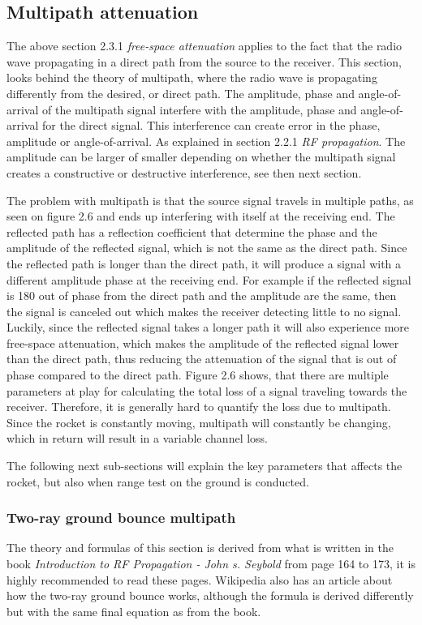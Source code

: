 \subsection{Multipath attenuation}
The above section 2.3.1 \textit{free-space attenuation} applies to the fact that the radio wave propagating in a direct path from the source to the receiver. This section, looks behind the theory of multipath, where the radio wave is propagating differently from the desired, or direct path. The amplitude, phase and angle-of-arrival of the multipath signal interfere with the amplitude, phase and angle-of-arrival for the direct signal. This interference can create error in the phase, amplitude or angle-of-arrival. As explained in section 2.2.1 \textit{RF propagation}. The amplitude can be larger of smaller depending on whether the multipath signal creates a constructive or destructive interference, see then next section. 

The problem with multipath is that the source signal travels in multiple paths, as seen on figure 2.6 and ends up interfering with itself at the receiving end. The reflected path has a reflection coefficient that determine the phase and the amplitude of the reflected signal, which is not the same as the direct path. Since the reflected path is longer than the direct path, it will produce a signal with a different amplitude phase at the receiving end. For example if the reflected signal is 180 out of phase from the direct path and the amplitude are the same, then the signal is canceled out which makes the receiver detecting little to no signal. Luckily, since the reflected signal takes a longer path it will also experience more free-space attenuation, which makes the amplitude of the reflected signal lower than the direct path, thus reducing the attenuation of the signal that is out of phase compared to the direct path. Figure 2.6 shows, that there are multiple parameters at play for calculating the total loss of a signal traveling towards the receiver. Therefore, it is generally hard to quantify the loss due to multipath. Since the rocket is constantly moving, multipath will constantly be changing, which in return will result in a variable channel loss. 

The following next sub-sections will explain the key parameters that affects the rocket, but also when range test on the ground is conducted. 

\subsubsection{Two-ray ground bounce multipath}
The theory and formulas of this section is derived from what is written in the book \textit{Introduction to RF Propagation - John s. Seybold}\cite{RFpropagation} from page 164 to 173, it is highly recommended to read these pages. Wikipedia also has an article\cite{Two-ray} about how the two-ray ground bounce works, although the formula is derived differently but with the same final equation as from the book. 

